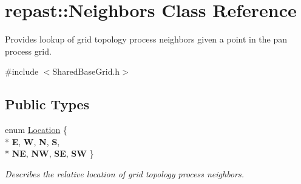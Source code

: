 \hypertarget{classrepast_1_1_neighbors}{\section{repast\-:\-:Neighbors Class Reference}
\label{classrepast_1_1_neighbors}
}


Provides lookup of grid topology process neighbors given a point in the pan process grid.  




{\ttfamily \#include $<$Shared\-Base\-Grid.\-h$>$}

\subsection*{Public Types}
\begin{DoxyCompactItemize}
\item 
enum \hyperlink{classrepast_1_1_neighbors_a7a695a73b614b849f12fd943329b8bdc}{Location} \{ \\*
{\bfseries E}, 
{\bfseries W}, 
{\bfseries N}, 
{\bfseries S}, 
\\*
{\bfseries N\-E}, 
{\bfseries N\-W}, 
{\bfseries S\-E}, 
{\bfseries S\-W}
 \}
\begin{DoxyCompactList}\small\item\em Describes the relative location of grid topology process neighbors. \end{DoxyCompactList}\end{DoxyCompactItemize}
